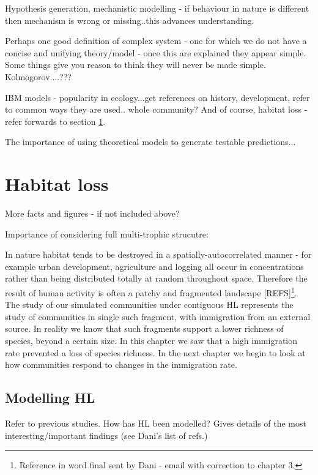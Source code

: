 Hypothesis generation, mechanistic modelling - if behaviour in nature is different then mechanism is wrong or missing..this advances understanding.

Perhaps one good definition of complex system - one for which we do not have a concise and unifying theory/model - once this are explained they appear simple. Some things give you reason to think they will never be made simple. Kolmogorov....???

IBM models - popularity in ecology...get references on history, development, refer to common ways they are used.. whole community? And of course, habitat loss - refer forwards to section \ref{sec:intro_habitat_loss}. 

The importance of using theoretical models to generate testable predictions...

\section{Habitat loss}
\label{sec:intro_habitat_loss}

More facts and figures - if not included above?

Importance of considering full multi-trophic strucutre: \cite{sole2006ecological}

In nature habitat tends to be destroyed in a spatially-autocorrelated manner - for example urban development, agriculture and logging all occur in concentrations rather than being distributed totally at random throughout space. Therefore the result of human activity is often a patchy and fragmented landscape [REFS]\footnote{Reference in word final sent by Dani - email with correction to chapter 3.}. The study of our simulated communities under contiguous HL represents the study of communities in single such fragment, with immigration from an external source. In reality we know that such fragments support a lower richness of species, beyond a certain size. In this chapter we saw that a high immigration rate prevented a loss of species richness. In the next chapter we begin to look at how communities respond to changes in the immigration rate.


\subsection{Modelling HL}
\label{sec:intro_modelling_HL}

Refer to previous studies. How has HL been modelled? Gives details of the most interesting/important findings (see Dani's list of refs.)

